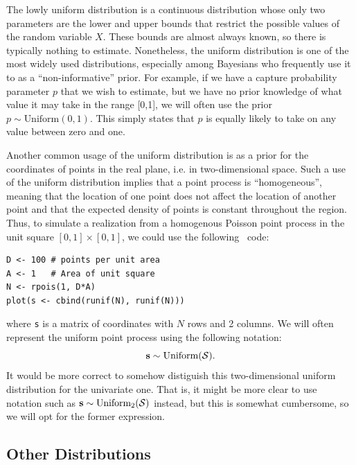 The %
lowly uniform distribution is a continuous distribution whose
only two parameters are the lower and upper bounds that restrict the
possible values of the random variable $X$. These bounds
are almost always known, so there is typically nothing to
estimate. Nonetheless, the uniform
distribution is one of the most widely used distributions,
especially among Bayesians who frequently use it to as a ``non-informative''
prior. For example, if we
have a capture probability parameter $p$ that we wish to estimate, but
we have no prior knowledge of what value it may take in the range
[0,1], we will often use the prior $p \sim \text{Uniform}(0,1)$. This
simply states that $p$ is equally likely to take on any value between
zero and one.

Another common usage of the uniform distribution is as a prior for the
coordinates of points in the real plane, i.e. in two-dimensional
space. Such a use of the uniform distribution implies that a point process is
``homogeneous'', meaning that the location of one point does not
affect the location of another point and that the expected density of
points is constant throughout the region. Thus, to simulate a
realization from a homogenous Poisson point process in the unit square
$[0,1] \times [0,1]$, we could use the following \R~code:
\begin{verbatim}
D <- 100 # points per unit area
A <- 1   # Area of unit square
N <- rpois(1, D*A)
plot(s <- cbind(runif(N), runif(N)))
\end{verbatim}
where \verb+s+ is a matrix of coordinates with $N$ rows and 2 columns. We
will often represent the uniform point process using the following notation:
\begin{equation}
  {\bf s} \sim \text{Uniform}(\mathcal{S}).
\end{equation}
It would be more correct to somehow distiguish this
two-dimensional uniform distribution for the univariate one. That is,
it might be more clear to use notation such as
${\bf s} \sim \text{Uniform}_2(\mathcal{S})$ instead, but this is somewhat
cumbersome, so we will opt for the former expression.


\subsection{Other Distributions}

